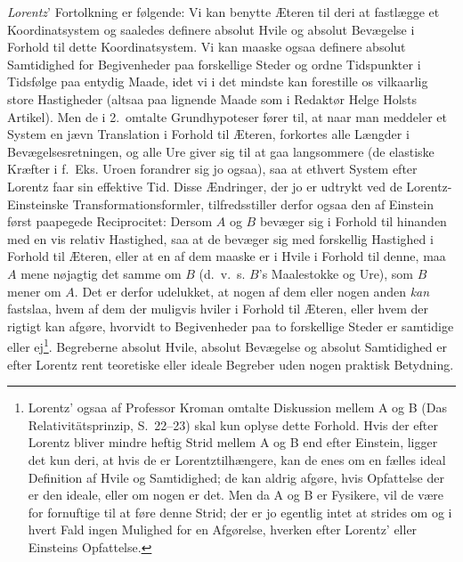 \documentclass[12pt,a4paper]{article}
\begin{document}
\emph{Lorentz}' Fortolkning er følgende: Vi kan benytte Æteren til deri
at fastlægge et Koordinatsystem og saaledes definere absolut Hvile og
absolut Bevægelse i Forhold til dette Koordinatsystem. Vi kan maaske
ogsaa definere absolut Samtidighed for Begivenheder paa forskellige
Steder og ordne Tidspunkter i Tidsfølge paa entydig Maade, idet vi i
det mindste kan forestille os vilkaarlig store Hastigheder (altsaa paa
lignende Maade som i Redaktør Helge Holsts Artikel). Men de i
2.~omtalte Grundhypoteser fører til, at naar man meddeler et System en
jævn Translation i Forhold til Æteren, forkortes alle Længder i
Bevægelsesretningen, og alle Ure giver sig til at gaa langsommere (de
elastiske Kræfter i f.~Eks. Uroen forandrer sig jo ogsaa), saa at
ethvert System efter Lorentz faar sin \guillemotright effektive
Tid\guillemotleft . Disse Ændringer, der jo er udtrykt ved de
Lorentz-Einsteinske Transformationsformler, tilfredsstiller derfor
ogsaa den af Einstein først paapegede Reciprocitet: Dersom $A$ og $B$
bevæger sig i Forhold til hinanden med en vis relativ Hastighed, saa at
de bevæger sig med forskellig Hastighed i Forhold til Æteren, eller at
en af dem maaske er i Hvile i Forhold til denne, maa $A$ mene nøjagtig
det samme om $B$ (d.~v.~s. $B$'s Maalestokke og Ure), som $B$ mener om
$A$. Det er derfor udelukket, at nogen af dem eller nogen anden
\emph{kan} fastslaa, hvem af dem der muligvis hviler i Forhold til
Æteren, eller hvem der rigtigt kan afgøre, hvorvidt to Begivenheder paa
to forskellige Steder er samtidige eller ej\footnote{Lorentz' ogsaa af
Professor Kroman omtalte Diskussion mellem A og B (Das
Relativitätsprinzip, S.~22--23) skal kun oplyse dette Forhold. Hvis der
efter Lorentz bliver mindre heftig Strid mellem A og B end efter
Einstein, ligger det kun deri, at hvis de er Lorentztilhængere, kan de
enes om en fælles ideal Definition af Hvile og Samtidighed; de kan
aldrig afgøre, hvis Opfattelse der er den ideale, eller om nogen er
det. Men da A og B er Fysikere, vil de være for fornuftige til at føre
denne Strid; der er jo egentlig intet at strides om og i hvert Fald
ingen Mulighed for en Afgørelse, hverken efter Lorentz' eller Einsteins
Opfattelse.}. Begreberne absolut Hvile, absolut Bevægelse og absolut
Samtidighed er efter Lorentz rent teoretiske eller ideale Begreber uden
nogen praktisk Betydning.
\end{document}
